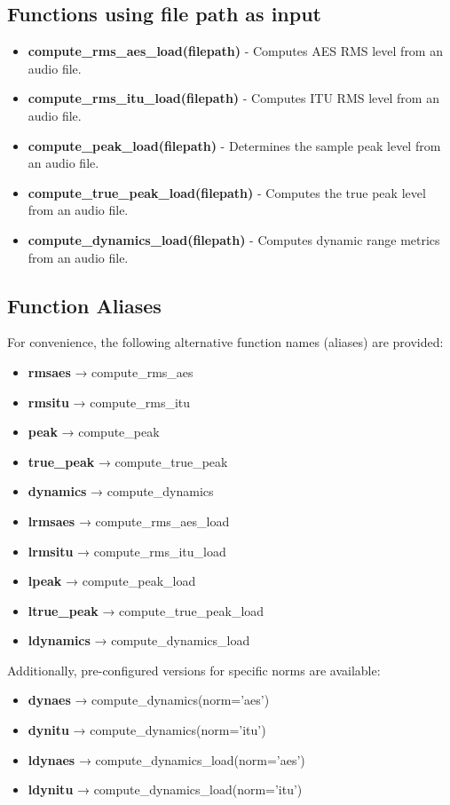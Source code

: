 \documentclass{article}
\begin{document}
\subsection{Functions using file path as input}
\begin{itemize}
    \item \textbf{compute\_rms\_aes\_load(filepath)} - Computes AES RMS level from an audio file.
    \item \textbf{compute\_rms\_itu\_load(filepath)} - Computes ITU RMS level from an audio file.
    \item \textbf{compute\_peak\_load(filepath)} - Determines the sample peak level from an audio file.
    \item \textbf{compute\_true\_peak\_load(filepath)} - Computes the true peak level from an audio file.
    \item \textbf{compute\_dynamics\_load(filepath)} - Computes dynamic range metrics from an audio file.
\end{itemize}

\subsection{Function Aliases}
For convenience, the following alternative function names (aliases) are provided:
\begin{itemize}
    \item \textbf{rmsaes} → compute\_rms\_aes
    \item \textbf{rmsitu} → compute\_rms\_itu
    \item \textbf{peak} → compute\_peak
    \item \textbf{true\_peak} → compute\_true\_peak
    \item \textbf{dynamics} → compute\_dynamics
    \item \textbf{lrmsaes} → compute\_rms\_aes\_load
    \item \textbf{lrmsitu} → compute\_rms\_itu\_load
    \item \textbf{lpeak} → compute\_peak\_load
    \item \textbf{ltrue\_peak} → compute\_true\_peak\_load
    \item \textbf{ldynamics} → compute\_dynamics\_load
\end{itemize}

Additionally, pre-configured versions for specific norms are available:
\begin{itemize}
    \item \textbf{dynaes} → compute\_dynamics(norm='aes')
    \item \textbf{dynitu} → compute\_dynamics(norm='itu')
    \item \textbf{ldynaes} → compute\_dynamics\_load(norm='aes')
    \item \textbf{ldynitu} → compute\_dynamics\_load(norm='itu')
\end{itemize}
\end{document}
